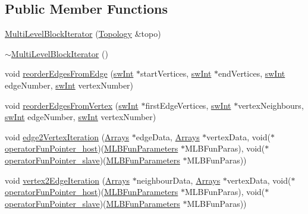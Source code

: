 \subsection*{Public Member Functions}
\begin{DoxyCompactItemize}
\item 
\hyperlink{classMultiLevelBlockIterator_a6d43aae7b5472800853effe7fb4c122a}{MultiLevelBlockIterator} (\hyperlink{classTopology}{Topology} \&topo)
\item 
\hyperlink{classMultiLevelBlockIterator_ae18852417b5b2b7db13b4aa727afa106}{$\sim$MultiLevelBlockIterator} ()
\item 
void \hyperlink{classMultiLevelBlockIterator_a329b89b35011569fd4c4c3e93518eea3}{reorderEdgesFromEdge} (\hyperlink{swMacro_8h_a113cf5f6b5377cdf3fac6aa4e443e9aa}{swInt} $\ast$startVertices, \hyperlink{swMacro_8h_a113cf5f6b5377cdf3fac6aa4e443e9aa}{swInt} $\ast$endVertices, \hyperlink{swMacro_8h_a113cf5f6b5377cdf3fac6aa4e443e9aa}{swInt} edgeNumber, \hyperlink{swMacro_8h_a113cf5f6b5377cdf3fac6aa4e443e9aa}{swInt} vertexNumber)
\item 
void \hyperlink{classMultiLevelBlockIterator_af2bc453fc11f9e0ba34a1edc7eafc34e}{reorderEdgesFromVertex} (\hyperlink{swMacro_8h_a113cf5f6b5377cdf3fac6aa4e443e9aa}{swInt} $\ast$firstEdgeVertices, \hyperlink{swMacro_8h_a113cf5f6b5377cdf3fac6aa4e443e9aa}{swInt} $\ast$vertexNeighbours, \hyperlink{swMacro_8h_a113cf5f6b5377cdf3fac6aa4e443e9aa}{swInt} edgeNumber, \hyperlink{swMacro_8h_a113cf5f6b5377cdf3fac6aa4e443e9aa}{swInt} vertexNumber)
\item 
void \hyperlink{classMultiLevelBlockIterator_ac43a134b15498ad6e7eec873b2f45f79}{edge2VertexIteration} (\hyperlink{structArrays}{Arrays} $\ast$edgeData, \hyperlink{structArrays}{Arrays} $\ast$vertexData, void($\ast$\hyperlink{test_8cpp_aecc50c51899b7a8153dc83e95c3e6976}{operatorFunPointer\_\-host})(\hyperlink{structMLBFunParameters}{MLBFunParameters} $\ast$MLBFunParas), void($\ast$\hyperlink{test_8cpp_a434737e1969edf175d1bea960d600584}{operatorFunPointer\_\-slave})(\hyperlink{structMLBFunParameters}{MLBFunParameters} $\ast$MLBFunParas))
\item 
void \hyperlink{classMultiLevelBlockIterator_ac4035c51b1a940a7661a7e1b15e7b086}{vertex2EdgeIteration} (\hyperlink{structArrays}{Arrays} $\ast$neighbourData, \hyperlink{structArrays}{Arrays} $\ast$vertexData, void($\ast$\hyperlink{test_8cpp_aecc50c51899b7a8153dc83e95c3e6976}{operatorFunPointer\_\-host})(\hyperlink{structMLBFunParameters}{MLBFunParameters} $\ast$MLBFunParas), void($\ast$\hyperlink{test_8cpp_a434737e1969edf175d1bea960d600584}{operatorFunPointer\_\-slave})(\hyperlink{structMLBFunParameters}{MLBFunParameters} $\ast$MLBFunParas))

\end{DoxyCompactItemize}
